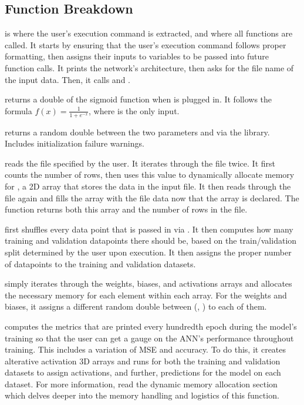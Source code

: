 \documentclass[12pt]{article}
\begin{document}
\subsection{Function Breakdown}

 is where the user’s execution command is extracted, and where all functions are called. It starts by ensuring that the user’s execution command follows proper formatting, then assigns their inputs to variables to be passed into future function calls. It prints the network’s architecture, then asks for the file name of the input data. Then, it calls  and .

 returns a double of the sigmoid function when  is plugged in. It follows the formula \(f(x) = \frac{1}{1 + e^{-x}}\), where  is the only input.

 returns a random double between the two parameters  and  via the  library. Includes  initialization failure warnings.

 reads the file specified by the user. It iterates through the file twice. It first counts the number of rows, then uses this value to dynamically allocate memory for , a 2D array that stores the data in the input file. It then reads through the file again and fills the array with the file data now that the array is declared. The function returns both this  array and the number of rows in the file.

 first shuffles every data point that is passed in via . It then computes how many training and validation datapoints there should be, based on the train/validation split determined by the user upon execution. It then assigns the proper number of datapoints to the training and validation datasets.

 simply iterates through the weights, biases, and activations arrays and allocates the necessary memory for each element within each array. For the weights and biases, it assigns a different random double between (, ) to each of them.

 computes the metrics that are printed every hundredth epoch during the model’s training so that the user can get a gauge on the ANN’s performance throughout training. This includes a variation of MSE and accuracy. To do this, it creates alterative activation 3D arrays and runs  for both the training and validation datasets to assign activations, and further, predictions for the model on each dataset. For more information, read the dynamic memory allocation section which delves deeper into the memory handling and logistics of this function.
\end{document}

